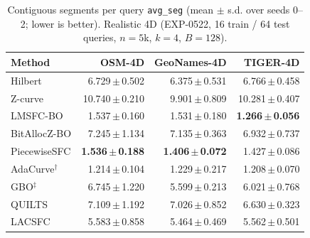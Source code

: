\begin{table}[t]
\centering\small
\caption{Contiguous segments per query \texttt{avg\_seg} (mean $\pm$ s.d. over seeds 0--2; lower is better). Realistic 4D (EXP-0522, 16 train / 64 test queries, $n=5$k, $k=4$, $B=128$).}
\label{tab:exp1110_0522_avg_seg}
\begin{tabular}{lrrr}
\toprule
Method & OSM-4D & GeoNames-4D & TIGER-4D \\
\midrule
Hilbert & 6.729\,$\pm$\,0.502 & 6.375\,$\pm$\,0.531 & 6.766\,$\pm$\,0.458 \\
Z-curve & 10.740\,$\pm$\,0.210 & 9.901\,$\pm$\,0.809 & 10.281\,$\pm$\,0.407 \\
LMSFC-BO & 1.537\,$\pm$\,0.160 & 1.531\,$\pm$\,0.180 & \textbf{1.266\,$\pm$\,0.056} \\
BitAllocZ-BO & 7.245\,$\pm$\,1.134 & 7.135\,$\pm$\,0.363 & 6.932\,$\pm$\,0.737 \\
PiecewiseSFC & \textbf{1.536\,$\pm$\,0.188} & \textbf{1.406\,$\pm$\,0.072} & 1.427\,$\pm$\,0.086 \\
AdaCurve$^\dagger$ & 1.214\,$\pm$\,0.104 & 1.229\,$\pm$\,0.217 & 1.208\,$\pm$\,0.070 \\
GBO$^\ddagger$ & 6.745\,$\pm$\,1.220 & 5.599\,$\pm$\,0.213 & 6.021\,$\pm$\,0.768 \\
QUILTS & 7.109\,$\pm$\,1.192 & 7.026\,$\pm$\,0.852 & 6.630\,$\pm$\,0.323 \\
LACSFC & 5.583\,$\pm$\,0.858 & 5.464\,$\pm$\,0.469 & 5.562\,$\pm$\,0.501 \\
\bottomrule
\end{tabular}
\end{table}
